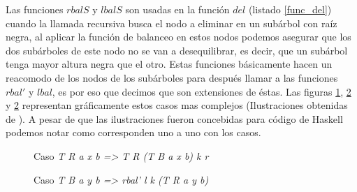 Las funciones \hyperref[lbalS]{$rbalS$} y \hyperref[lbalS]{$lbalS$} son usadas en la funci\'on 
\hyperref[func_del]{$del$} (listado \ref{func_del}) cuando la llamada recursiva busca el nodo a 
eliminar en un sub\'arbol con ra\'iz negra, al aplicar la funci\'on de balanceo en estos nodos 
podemos asegurar que los dos subárboles de este nodo no se van a desequilibrar, es decir, que un 
subárbol tenga mayor altura negra que el otro. Estas funciones b\'asicamente hacen un reacomodo de 
los nodos de los sub\'arboles para despu\'es llamar a las funciones \hyperref[rbal_2]{$rbal'$} y 
\hyperref[func_balanceo]{$lbal$}, es por eso que decimos que son extensiones de \'estas. Las figuras \ref{balanceo_grafico_del_1}, \ref{balanceo_grafico_del_2} y \ref{balanceo_grafico_del_2} representan gr\'aficamente estos casos mas complejos (Ilustraciones obtenidas de \cite{tesisG}). 
A pesar de que las ilustraciones fueron concebidas para c\'odigo de Haskell podemos notar como corresponden uno a uno con los casos.

\begin{figure}[!ht]
\centering
\captionsetup{justification=centering}
\caption{Caso \textit{T R a x b => T R (T B a x b) k r}}
\label{balanceo_grafico_del_1}
\end{figure}

\begin{figure}[!ht]
\centering
\captionsetup{justification=centering}
\caption{Caso \textit{T B a y b => rbal' l k (T R a y b)}}
\label{balanceo_grafico_del_2}
\end{figure}

